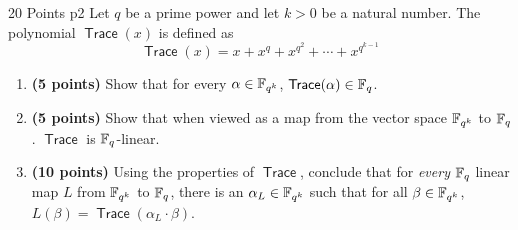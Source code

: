 \documentclass[a4paper, 11pt]{article}
\DeclareMathOperator{\trac}{\textsf{Trace}}
\begin{document}
\begin{problem}{%
	\hfill 20 Points
	}{p2%
	}
Let $q$ be a prime power and let $k>0$ be a natural number. The polynomial $\trac(x)$ is defined as $$\trac(x)=x+x^q+x^{q^2}+\cdots +x^{q^{k-1}}$$
\begin{enumerate}[label=(\alph*)]
	\item \textbf{(5 points)} Show that for every $\alpha\in\mathbb{F}_{q^k}$, $\trac(\alpha)\in\bbF_q$.
	\item \textbf{(5 points)} Show that when viewed as a map from the vector space $\mathbb{F}_{q^k}$ to $\mathbb{F}_q$. $\trac$ is $\mathbb{F}_q$-linear.
	\item \textbf{(10 points)} Using the properties of $\trac$, conclude that for \textit{every}  $\mathbb{F}_q$ linear map $L$ from $\mathbb{F}_{q^k}$ to $\mathbb{F}_q$, there is an $\alpha_L\in\mathbb{F}_{q^k}$ such that  for all $\beta\in\mathbb{F}_{q^k}$, $L(\beta)=\trac(\alpha_L\cdot \beta)$.
\end{enumerate}
\end{problem}
\end{document}
